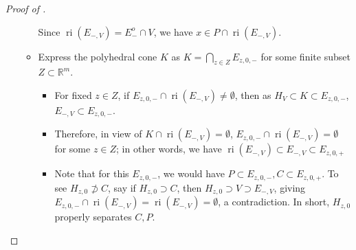 \begin{proof}[Proof of ]
\begin{itemize}
\begin{itemize}
			            Since $\operatorname{ri}(E_{-,V})=E_-^o\cap V$, we have $x\in P\cap \operatorname{ri}(E_{-,V})$.
			      \item Express the polyhedral cone $K$ as $K=\bigcap_{z\in Z}E_{z,0,-}$ for some finite subset $Z\subset \mathbb{R}^m$.
			            \begin{itemize}
				            \item For fixed $z\in Z$, if $E_{z,0,-}\cap \operatorname{ri}(E_{-,V})\neq\emptyset$, then as $H_V\subset K\subset E_{z,0,-}$, $E_{-,V}\subset E_{z,0,-}$.
				            \item Therefore, in view of $K\cap \operatorname{ri}(E_{-,V})=\emptyset$, $E_{z,0,-}\cap \operatorname{ri}(E_{-,V})=\emptyset$ for some $z\in Z$; in other words, we have $\operatorname{ri}(E_{-,V})\subset E_{-,V}\subset E_{z,0,+}$
				            \item Note that for this $E_{z,0,-}$, we would have $P\subset E_{z,0,-},C\subset E_{z,0,+}$. To see $H_{z,0}\nsupset C$, say if $H_{z,0}\supset C$, then $H_{z,0}\supset V\supset E_{-,V}$, giving $E_{z,0,-}\cap \operatorname{ri}(E_{-,V})=\operatorname{ri}(E_{-,V})=\emptyset$, a contradiction. In short, $H_{z,0}$ properly separates $C,P$.\qedhere{}
			            \end{itemize}
		      \end{itemize}
	\end{itemize}
\end{proof}
